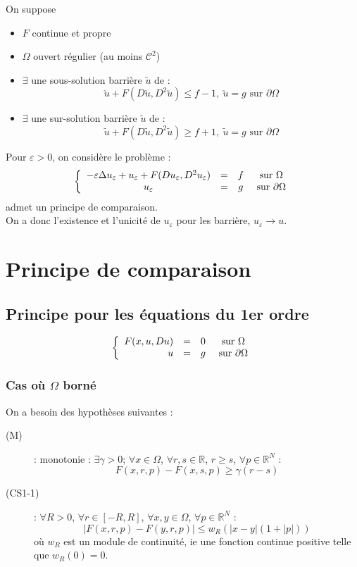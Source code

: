 On suppose \begin{itemize}
	\item $F$ continue et propre
	\item $\Omega$ ouvert régulier (au moins $\mathcal{C}^2$)
	\item $\exists$ une sous-solution barrière $\utilde{u}$ de : \[\utilde{u}+F(D\utilde{u},D^2\utilde{u})\leq f-1,\ \utilde{u}=g \text{ sur }\partial\Omega\]
	\item $\exists$ une sur-solution barrière $\tilde{u}$ de : \[\tilde{u}+F(D\tilde{u},D^2\tilde{u})\geq f+1,\ \tilde{u}=g \text{ sur }\partial\Omega\]
\end{itemize}

Pour $\varepsilon>0$, on considère le problème :
\[\left\{\begin{array}{c c c c}
-\varepsilon\Delta u_\varepsilon+u_\varepsilon+F(Du_\varepsilon,D^2u_\varepsilon)&=&f &\text{ sur } \Omega\\
u_\varepsilon&=&g &\text{ sur } \partial\Omega
\end{array}\right.\]
admet un principe de comparaison.\\
On a donc l'existence et l'unicité de $u_\varepsilon$ pour les barrière, $u_\varepsilon\to u$.

\section{Principe de comparaison}
\subsection{Principe pour les équations du 1er ordre}

\[\left\{ \begin{array}{r c c c}
	F(x,u,Du)&=&0 &\text{ sur } \Omega\\
	u&=&g &\text{ sur } \partial\Omega
\end{array}\right.\]

\subsubsection{Cas où $\Omega$ borné}
On a besoin des hypothèses suivantes : \begin{description}
	\item[\label{Mono} (M)] : monotonie : $\exists\gamma>0$; $\forall x\in\Omega$, $\forall r,s\in\mathbb{R}$, $r\geq s$, $\forall p\in\mathbb{R}^N$ : \[F(x,r,p)-F(x,s,p)\geq \gamma(r-s)\]
	\item[\label{CS11} (CS1-1)] : $\forall R>0$, $\forall r\in[-R,R]$, $\forall x,y\in\Omega$, $\forall p\in\mathbb{R}^N$ : \[|F(x,r,p)-F(y,r,p)|\leq w_R\left(|x-y|(1+|p|)\right)\]
où $w_R$ est un module de continuité, ie une fonction continue positive telle que $w_R(0)=0$.
\end{description}

